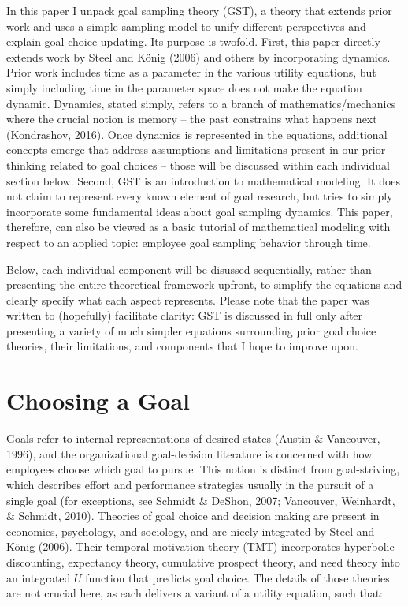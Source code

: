 \documentclass[english,,man]{apa6}
\theoremstyle{definition}
\theoremstyle{definition}
\theoremstyle{definition}
\theoremstyle{remark}
\begin{document}
In this paper I unpack goal sampling theory (GST), a theory that extends
prior work and uses a simple sampling model to unify different
perspectives and explain goal choice updating. Its purpose is twofold.
First, this paper directly extends work by Steel and König (2006) and
others by incorporating dynamics. Prior work includes time as a
parameter in the various utility equations, but simply including time in
the parameter space does not make the equation dynamic. Dynamics, stated
simply, refers to a branch of mathematics/mechanics where the crucial
notion is memory -- the past constrains what happens next (Kondrashov,
2016). Once dynamics is represented in the equations, additional
concepts emerge that address assumptions and limitations present in our
prior thinking related to goal choices -- those will be discussed within
each individual section below. Second, GST is an introduction to
mathematical modeling. It does not claim to represent every known
element of goal research, but tries to simply incorporate some
fundamental ideas about goal sampling dynamics. This paper, therefore,
can also be viewed as a basic tutorial of mathematical modeling with
respect to an applied topic: employee goal sampling behavior through
time.

Below, each individual component will be disussed sequentially, rather
than presenting the entire theoretical framework upfront, to simplify
the equations and clearly specify what each aspect represents. Please
note that the paper was written to (hopefully) facilitate clarity: GST
is discussed in full only after presenting a variety of much simpler
equations surrounding prior goal choice theories, their limitations, and
components that I hope to improve upon.

\hypertarget{choosing-a-goal}{%
\section{Choosing a Goal}\label{choosing-a-goal}}

Goals refer to internal representations of desired states (Austin \&
Vancouver, 1996), and the organizational goal-decision literature is
concerned with how employees choose which goal to pursue. This notion is
distinct from goal-striving, which describes effort and performance
strategies usually in the pursuit of a single goal (for exceptions, see
Schmidt \& DeShon, 2007; Vancouver, Weinhardt, \& Schmidt, 2010).
Theories of goal choice and decision making are present in economics,
psychology, and sociology, and are nicely integrated by Steel and König
(2006). Their temporal motivation theory (TMT) incorporates hyperbolic
discounting, expectancy theory, cumulative prospect theory, and need
theory into an integrated \(U\) function that predicts goal choice. The
details of those theories are not crucial here, as each delivers a
variant of a utility equation, such that:
\end{document}
